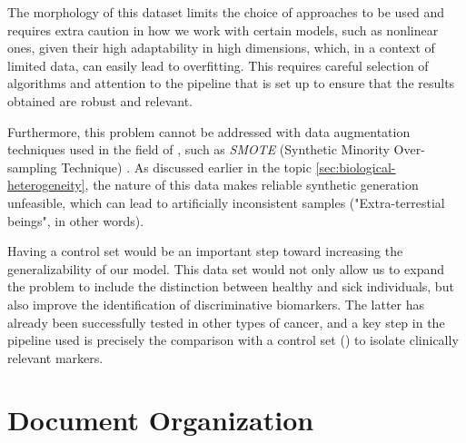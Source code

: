 The morphology of this dataset limits the choice of approaches to be used and
requires extra caution in how we work with certain models, such as nonlinear
ones, given their high adaptability in high dimensions, which, in a context of
limited data, can easily lead to overfitting. This requires careful selection
of algorithms and attention to the pipeline that is set up to ensure that the
results obtained are robust and relevant.

Furthermore, this problem cannot be addressed with data augmentation techniques
used in the field of , such as \textit{SMOTE} (Synthetic Minority
Over-sampling Technique) \textcite{SMOTE_Blagus2013SMOTE}. As discussed earlier
in the topic \ref{sec:biological-heterogeneity}, the nature of this data makes
reliable synthetic generation unfeasible, which can lead to artificially
inconsistent samples ("Extra-terrestial beings", in other words).

Having a control set would be an important step toward increasing the
generalizability of our model. This data set would not only allow us to expand
the problem to include the distinction between healthy and sick individuals,
but also improve the identification of discriminative biomarkers. The latter
has already been successfully tested in other types of cancer, and a key step
in the pipeline used is precisely the comparison with a control set
(\textcite{ml_gastric_Azari2023}) to isolate clinically relevant markers.

\section{Document Organization}
\label{sec:document-organization}